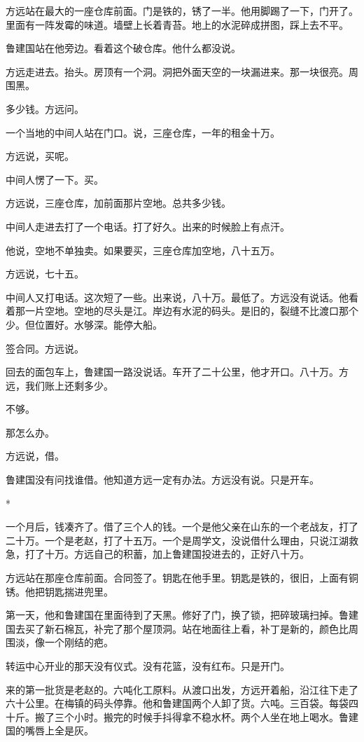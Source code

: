\documentclass[UTF8,a5paper,11pt,openany]{ctexbook}
\newcommand{\scene}{\vspace{1em}\begin{center}*\quad*\quad*\end{center}\vspace{0.5em}}
\begin{document}
方远站在最大的一座仓库前面。门是铁的，锈了一半。他用脚踢了一下，门开了。里面有一阵发霉的味道。墙壁上长着青苔。地上的水泥碎成拼图，踩上去不平。

鲁建国站在他旁边。看着这个破仓库。他什么都没说。

方远走进去。抬头。房顶有一个洞。洞把外面天空的一块漏进来。那一块很亮。周围黑。

多少钱。方远问。

一个当地的中间人站在门口。说，三座仓库，一年的租金十万。

方远说，买呢。

中间人愣了一下。买。

方远说，三座仓库，加前面那片空地。总共多少钱。

中间人走进去打了一个电话。打了好久。出来的时候脸上有点汗。

他说，空地不单独卖。如果要买，三座仓库加空地，八十五万。

方远说，七十五。

中间人又打电话。这次短了一些。出来说，八十万。最低了。方远没有说话。他看着那一片空地。空地的尽头是江。岸边有水泥的码头。是旧的，裂缝不比渡口那个少。但位置好。水够深。能停大船。

签合同。方远说。

回去的面包车上，鲁建国一路没说话。车开了二十公里，他才开口。八十万。方远，我们账上还剩多少。

不够。

那怎么办。

方远说，借。

鲁建国没有问找谁借。他知道方远一定有办法。方远没有说。只是开车。


\scene

一个月后，钱凑齐了。借了三个人的钱。一个是他父亲在山东的一个老战友，打了二十万。一个是老赵，打了十五万。一个是周学文，没说借什么理由，只说江湖救急，打了十万。方远自己的积蓄，加上鲁建国投进去的，正好八十万。

方远站在那座仓库前面。合同签了。钥匙在他手里。钥匙是铁的，很旧，上面有铜锈。他把钥匙揣进兜里。

第一天，他和鲁建国在里面待到了天黑。修好了门，换了锁，把碎玻璃扫掉。鲁建国去买了新石棉瓦，补完了那个屋顶洞。站在地面往上看，补丁是新的，颜色比周围淡，像一个刚结的疤。

转运中心开业的那天没有仪式。没有花篮，没有红布。只是开门。

来的第一批货是老赵的。六吨化工原料。从渡口出发，方远开着船，沿江往下走了六十公里。在梅镇的码头停靠。他和鲁建国两个人卸了货。六吨。三百袋。每袋四十斤。搬了三个小时。搬完的时候手抖得拿不稳水杯。两个人坐在地上喝水。鲁建国的嘴唇上全是灰。
\end{document}

